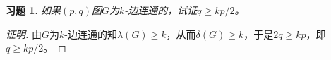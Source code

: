 \documentclass{article}
\begin{document}
\begin{CJK}{UTF8}{gbsn}
\newtheorem*{Ex}{习题}
\begin{Ex}
如果$(p,q)$图$G$为$k$-边连通的，试证$q\geq kp/2$。
\end{Ex}
\begin{proof}[证明]
  由$G$为$k$-边连通的知$\lambda(G)\geq k$，从而$\delta(G)\geq k$，于是$2q\geq kp$，即$q\geq kp/2$。
\end{proof}
\end{CJK}
\end{document}
